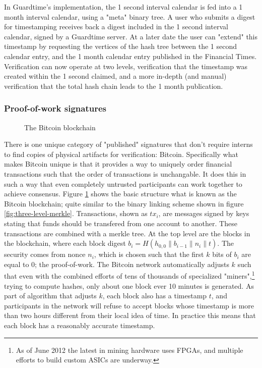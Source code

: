 \documentclass{article}
\begin{document}
In Guardtime's implementation, the 1 second interval calendar is fed into a 1
month interval calendar, using a "meta" binary tree. A user who submits a
digest for timestamping receives back a digest included in the 1 second
interval calendar, signed by a Guardtime server. At a later date the user can
"extend" this timestamp by requesting the vertices of the hash tree between the
1 second calendar entry, and the 1 month calendar entry published in the
Financial Times.  Verification can now operate at two levels, verification that
the timestamp was created within the 1 second claimed, and a more in-depth (and
manual) verification that the total hash chain leads to the 1 month
publication.\cite{guardtime-tech-overview}

\subsubsection{Proof-of-work signatures}

\begin{figure}
        \centering
        
        \caption{The Bitcoin blockchain}
        \label{fig:bitcoin-overview}
\end{figure}

There is one unique category of "published" signatures that don't require
interns to find copies of physical artifacts for verification: Bitcoin.
Specifically what makes Bitcoin unique is that it provides a way to uniquely
order financial transactions such that the order of transactions is
unchangable. It does this in such a way that even completely untrusted
participants can work together to achieve consensus.\cite{Nakamoto_bitcoin:a}
Figure \ref{fig:bitcoin-overview} shows the basic structure what is known as
the Bitcoin blockchain; quite similar to the binary linking scheme shown in
figure \ref{fig:three-level-merkle}. Transactions, shown as $tx_i$, are
messages signed by keys stating that funds should be transfered from one
account to another. These transactions are combined with a merkle tree. At the
top level are the blocks in the blockchain, where each block digest
$b_i=H(h_{0,0} \| b_{i-1} \| n_i \| t)$. The security comes from nonce $n_i$,
which is chosen such that the first $k$ bits of $b_i$ are equal to $0$; the
proof-of-work. The Bitcoin network automatically adjusts $k$ such that even
with the combined efforts of tens of thousands of specialized
"miners",\footnote{As of June 2012 the latest in mining hardware uses FPGAs,
and multiple efforts to build custom ASICs are underway.} trying to compute
hashes, only about one block ever 10 minutes is generated. As part of algorithm
that adjusts $k$, each block also has a timestamp $t$, and participants in the
network will refuse to accept blocks whose timestamp is more than two hours
different from their local idea of time. In practice this means that each block
has a reasonably accurate timestamp.
\end{document}
